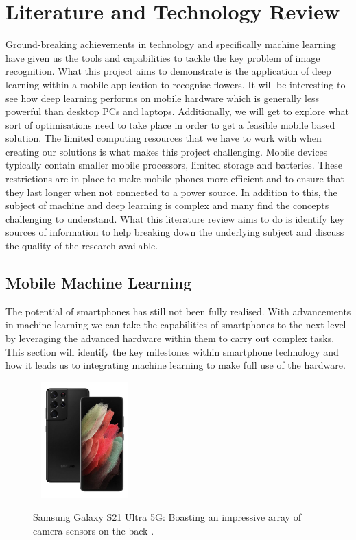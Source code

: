 \documentclass[12pt,a4paper]{report}
\begin{document}
\clearpage
\chapter{Literature and Technology Review}

Ground-breaking achievements in technology and specifically machine learning have given us the tools and capabilities to
tackle the key problem of image recognition. What this project aims to demonstrate is the application of deep learning 
within a mobile application to recognise flowers. It will be interesting to see how deep learning performs on mobile 
hardware which is generally less powerful than desktop PCs and laptops. Additionally, we will get to explore what sort 
of optimisations need to take place in order to get a feasible mobile based solution.  The limited computing resources 
that we have to work with when creating our solutions is what makes this project challenging. Mobile devices typically 
contain smaller mobile processors, limited storage and batteries. These restrictions are in place to 
make mobile phones more efficient and to ensure that they last longer when not connected to a power source. In addition
to this, the subject of machine and deep learning is complex and many find the concepts challenging to understand. 
What this literature review aims to do is identify key sources of information to help breaking down the underlying 
subject and discuss the quality of the research available.

\section{Mobile Machine Learning}

The potential of smartphones has still not been fully realised. With advancements in machine learning we can take the 
capabilities of smartphones to the next level by leveraging the advanced hardware within them to carry out complex 
tasks. This section will identify the key milestones within smartphone technology and how it leads us to integrating 
machine learning to make full use of the hardware.

\begin{figure}[h]\
    \centering
    \includegraphics[width=0.3\textwidth]{s21ultra.jpg}
    \caption{Samsung Galaxy S21 Ultra 5G: Boasting an impressive array of camera sensors on the back \citep{three2021}.}
\end{figure}
\end{document}
